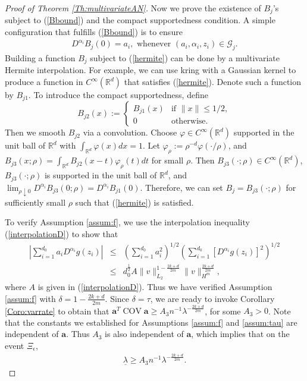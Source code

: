 \documentclass[12pt]{article}
\theoremstyle{plain}
\theoremstyle{remark}
\begin{document}
\begin{proof}[Proof of Theorem \ref{Th:multivariateAN}]
    Now we prove the existence of $B_j$'s subject to (\ref{Bbound}) and the compact supportedness condition. A simple configuration that fulfills (\ref{Bbound}) is to ensure 
    \begin{eqnarray}\label{hermite}
        D^{\alpha_i}B_j(0)=a_i, \text{ whenever } (a_i,\alpha_i,z_i)\in\mathcal{G}_j.
    \end{eqnarray}
    Building a function $B_j$ subject to (\ref{hermite}) can be done by a multivariate Hermite interpolation. For example, we can use kring \cite{MorrisMitchellYlvisaker93,zongmin1992hermite} with a Gaussian kernel to produce a function in $C^\infty(\mathbb{R}^d)$ that satisfies (\ref{hermite}). Denote such a function by $B_{j1}$. To introduce the compact supportedness, define
    \[
    B_{j2}(x):=
    \begin{cases}
        B_{j1}(x) & \text{if } \|x\|\leq 1/2,\\
        0       & \text{otherwise.}
    \end{cases}
    \]
    Then we smooth $B_{j2}$ via a convolution. Choose $\varphi\in C^\infty(\mathbb{R}^d)$ supported in the unit ball of $\mathbb{R}^d$ with $\int_{\mathbb{R}^d}\varphi(x)dx=1$. Let $\varphi_\rho:=\rho^{-d}\varphi(\cdot/\rho)$, and $B_{j3}(x;\rho)=\int_{\mathbb{R}^d}B_{j2}(x-t)\varphi_\rho(t)dt$ for small $\rho$. Then $B_{j3}(\cdot;\rho)\in C^\infty(\mathbb{R}^d)$, $B_{j3}(\cdot;\rho)$ is supported in the unit ball of $\mathbb{R}^d$, and $\lim_{\rho\downarrow 0}D^{\alpha_i}B_{j3}(0;\rho)=D^{\alpha_i}B_{j1}(0)$. Therefore, we can set $B_j=B_{j3}(\cdot;\rho)$ for sufficiently small $\rho$ such that (\ref{hermite}) is satisfied.

    To verify Assumption \ref{assum:f}, we use the interpolation inequality (\ref{interpolationD}) to show that
    \begin{eqnarray*}
        \left|\sum_{i=1}^{d_0}a_i D^{\alpha_i}g(z_i)\right|&\leq& \left(\sum_{i=1}^{d_0}a_i^2\right)^{1/2}\left(\sum_{i=1}^{d_0}[D^{\alpha_i}g(z_i)]^2\right)^{1/2}\\
        &\leq&d_0^{\frac{1}{2}}A\|v\|^{1-\frac{2k+d}{2m}}_{L_2}\|v\|^{\frac{2k+d}{2m}}_{H^m},
    \end{eqnarray*}
    where $A$ is given in (\ref{interpolationD}).
    Thus we have verified Assumption \ref{assum:f} with $\delta=1-\frac{2k+d}{2m}$.
    Since $\delta=\tau$, we are ready to invoke Corollary \ref{Coro:varrate} to obtain that $\mathbf{a}^T\operatorname{COV}\mathbf{a}\geq A_3 n^{-1}\lambda^{-\frac{2k+d}{2m}}$, for some $A_3>0$. Note that the constants we established for Assumptions \ref{assum:f} and \ref{assum:tau} are independent of $\mathbf{a}$. Thus $A_3$ is also independent of $\mathbf{a}$, which implies that on the event $\Xi_\epsilon$,
    \begin{eqnarray}\label{eigenlower}
        \underline{\lambda}\geq A_3n^{-1}\lambda^{-\frac{2k+d}{2m}}.
    \end{eqnarray}
    

\end{proof}
\end{document}
